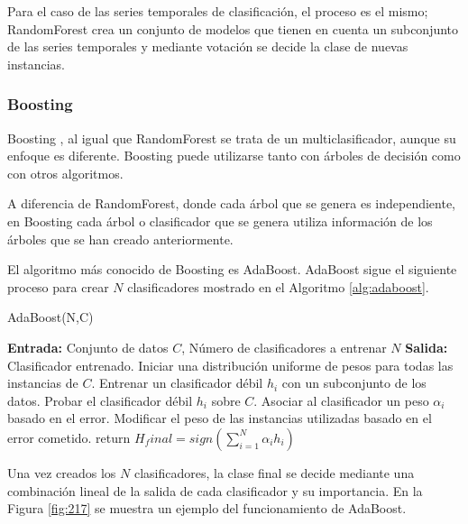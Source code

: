 Para el caso de las series temporales de clasificación, el proceso es el mismo; RandomForest crea un conjunto de modelos que tienen en cuenta un subconjunto de las series temporales y mediante votación se decide la clase de nuevas instancias.

\subsubsection{Boosting}
Boosting \cite{schapire1999brief}, al igual que RandomForest se trata de un multiclasificador, aunque su enfoque es diferente. Boosting puede utilizarse tanto con árboles de decisión como con otros algoritmos.\newline

A diferencia de RandomForest, donde cada árbol que se genera es independiente, en Boosting cada árbol o clasificador que se genera utiliza información de los árboles que se han creado anteriormente.\newline

El algoritmo más conocido de Boosting es AdaBoost. AdaBoost sigue el siguiente proceso para crear $N$ clasificadores mostrado en el Algoritmo \ref{alg:adaboost}. \newline

\begin{algorithm}[H]
	\caption{AdaBoost(N,C)}
	\label{alg:adaboost}
	\begin{algorithmic}[0]
		\State \textbf{Entrada:} Conjunto de datos $C$, Número de clasificadores a entrenar $N$
		\State \textbf{Salida:} Clasificador entrenado.
		\State Iniciar una distribución uniforme de pesos para todas las instancias de $C$.
			\State Entrenar un clasificador débil $h_i$ con un subconjunto de los datos.
			\State Probar el clasificador débil $h_i$ sobre $C$.
			\State Asociar al clasificador un peso $\alpha_i$ basado en el error.
			\State Modificar el peso de las instancias utilizadas basado en el error cometido.
		\EndFor
		\State return $H_final = sign(\sum_{i=1}^{N}\alpha_ih_i)$
	\end{algorithmic}
\end{algorithm}
\verticalspace

Una vez creados los $N$ clasificadores, la clase final se decide mediante una combinación lineal de la salida de cada clasificador y su importancia. En la Figura \ref{fig:217} se muestra un ejemplo del funcionamiento de AdaBoost.\newline

